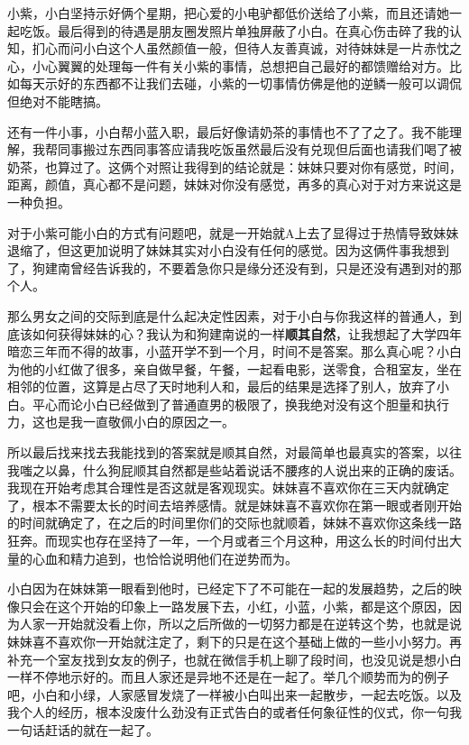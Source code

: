 \documentclass{article}
\begin{document}
小紫，小白坚持示好俩个星期，把心爱的小电驴都低价送给了小紫，而且还请她一起吃饭。最后得到的待遇是朋友圈发照片单独屏蔽了小白。在真心伤击碎了我的认知，扪心而问小白这个人虽然颜值一般，但待人友善真诚，对待妹妹是一片赤忱之心，小心翼翼的处理每一件有关小紫的事情，总想把自己最好的都馈赠给对方。比如每天示好的东西都不让我们去碰，小紫的一切事情仿佛是他的逆鳞一般可以调侃但绝对不能瞎搞。

还有一件小事，小白帮小蓝入职，最后好像请奶茶的事情也不了了之了。我不能理解，我帮同事搬过东西同事答应请我吃饭虽然最后没有兑现但后面也请我们喝了被奶茶，也算过了。这俩个对照让我得到的结论就是：妹妹只要对你有感觉，时间，距离，颜值，真心都不是问题，妹妹对你没有感觉，再多的真心对于对方来说这是一种负担。

对于小紫可能小白的方式有问题吧，就是一开始就A上去了显得过于热情导致妹妹退缩了，但这更加说明了妹妹其实对小白没有任何的感觉。因为这俩件事我想到了，狗建南曾经告诉我的，不要着急你只是缘分还没有到，只是还没有遇到对的那个人。

那么男女之间的交际到底是什么起决定性因素，对于小白与你我这样的普通人，到底该如何获得妹妹的心？我认为和狗建南说的一样\textbf{顺其自然}，让我想起了大学四年暗恋三年而不得的故事，小蓝开学不到一个月，时间不是答案。那么真心呢？小白为他的小红做了很多，亲自做早餐，午餐，一起看电影，送零食，合租室友，坐在相邻的位置，这算是占尽了天时地利人和，最后的结果是选择了别人，放弃了小白。平心而论小白已经做到了普通直男的极限了，换我绝对没有这个胆量和执行力，这也是我一直敬佩小白的原因之一。

所以最后找来找去我能找到的答案就是顺其自然，对最简单也最真实的答案，以往我嗤之以鼻，什么狗屁顺其自然都是些站着说话不腰疼的人说出来的正确的废话。我现在开始考虑其合理性是否这就是客观现实。妹妹喜不喜欢你在三天内就确定了，根本不需要太长的时间去培养感情。就是妹妹喜不喜欢你在第一眼或者刚开始的时间就确定了，在之后的时间里你们的交际也就顺着，妹妹不喜欢你这条线一路狂奔。而现实也存在坚持了一年，一个月或者三个月这种，用这么长的时间付出大量的心血和精力追到，也恰恰说明他们在逆势而为。

小白因为在妹妹第一眼看到他时，已经定下了不可能在一起的发展趋势，之后的映像只会在这个开始的印象上一路发展下去，小红，小蓝，小紫，都是这个原因，因为人家一开始就没看上你，所以之后所做的一切努力都是在逆转这个势，也就是说妹妹喜不喜欢你一开始就注定了，剩下的只是在这个基础上做的一些小小努力。再补充一个室友找到女友的例子，也就在微信手机上聊了段时间，也没见说是想小白一样不停地示好的。而且人家还是异地不还是在一起了。举几个顺势而为的例子吧，小白和小绿，人家感冒发烧了一样被小白叫出来一起散步，一起去吃饭。以及我个人的经历，根本没废什么劲没有正式告白的或者任何象征性的仪式，你一句我一句话赶话的就在一起了。
\end{document}
